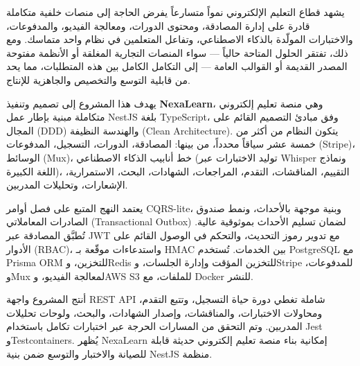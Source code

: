 \begin{otherlanguage}{arabic}
\sloppy
يشهد قطاع التعليم الإلكتروني نمواً متسارعاً يفرض الحاجة إلى منصات خلفية متكاملة قادرة على إدارة المصادقة، ومحتوى الدورات، ومعالجة الفيديو، والمدفوعات، والاختبارات المولّدة بالذكاء الاصطناعي، وتفاعل المتعلمين في نظام واحد متماسك. ومع ذلك، تفتقر الحلول المتاحة حالياً \textenglish{---} سواء المنصات التجارية المغلقة أو الأنظمة مفتوحة المصدر القديمة أو القوالب العامة \textenglish{---} إلى التكامل الكامل بين هذه المتطلبات، مما يحد من قابلية التوسع والتخصيص والجاهزية للإنتاج.

يهدف هذا المشروع إلى تصميم وتنفيذ \textenglish{\textbf{NexaLearn}}، وهي منصة تعليم إلكتروني متكاملة مبنية بإطار عمل \textenglish{NestJS} بلغة \textenglish{TypeScript}، وفق مبادئ التصميم القائم على المجال \textenglish{(DDD)} والهندسة النظيفة \textenglish{(Clean Architecture)}. يتكون النظام من أكثر من خمسة عشر سياقاً محدداً، من بينها: المصادقة، الدورات، التسجيل، المدفوعات \textenglish{(Stripe)}، الوسائط \textenglish{(Mux)}، خط أنابيب الذكاء الاصطناعي (توليد الاختبارات عبر \textenglish{Whisper} ونماذج اللغة الكبيرة)، التقييم، المناقشات، التقدم، المراجعات، الشهادات، البحث، الاستمرارية، الإشعارات، وتحليلات المدربين.

يعتمد النهج المتبع على فصل أوامر \textenglish{CQRS-lite}، وبنية موجهة بالأحداث، ونمط صندوق الصادرات المعاملاتي \textenglish{(Transactional Outbox)} لضمان تسليم الأحداث بموثوقية عالية. تُطبَّق المصادقة عبر \textenglish{JWT} مع تدوير رموز التحديث، والتحكم في الوصول القائم على الأدوار \textenglish{(RBAC)}، واستدعاءات موقّعة بـ \textenglish{HMAC} بين الخدمات. تُستخدم \textenglish{PostgreSQL} مع \textenglish{Prisma ORM} للتخزين، و\textenglish{Redis} للتخزين المؤقت وإدارة الجلسات، و\textenglish{Stripe} للمدفوعات، و\textenglish{Mux} لمعالجة الفيديو، و\textenglish{AWS S3} للملفات، مع \textenglish{Docker} للنشر.

أنتج المشروع واجهة \textenglish{REST API} شاملة تغطي دورة حياة التسجيل، وتتبع التقدم، ومحاولات الاختبارات، والمناقشات، وإصدار الشهادات، والبحث، ولوحات تحليلات المدربين. وتم التحقق من المسارات الحرجة عبر اختبارات تكامل باستخدام \textenglish{Jest} و\textenglish{Testcontainers}. يُظهر \textenglish{NexaLearn} إمكانية بناء منصة تعليم إلكتروني حديثة قابلة للصيانة والاختبار والتوسع ضمن بنية \textenglish{NestJS} منظمة.
\end{otherlanguage}

\clearpage
